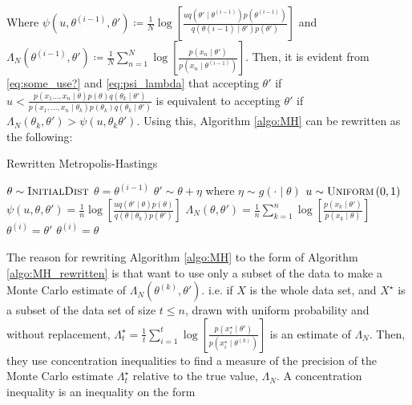 Where $\psi\left(u, \theta^{(i-1)}, \theta'\right)\coloneqq \frac{1}{N}\log\left[\frac{u q\left(\theta'\mid\theta^{(i-1)}\right)p\left(\theta^{(i-1)}\right)}{q\left(\theta{(i-1)}\mid \theta'\right)p\left(\theta'\right)}\right]$ and $\Lambda_N\left(\theta^{(i-1)}, \theta'\right) \coloneqq \frac{1}{N}\sum_{n = 1}^N \log\left[\frac{p\left(x_n\mid \theta'\right)}{p\left(x_n\mid\theta^{(i-1)}\right)}\right]$. Then, it is evident from \eqref{eq:some_use?} and \eqref{eq:psi_lambda} that accepting $\theta'$ if $u < \frac{p\left(x_1\ldots, x_n\mid \theta\right)p\left(\theta\right)q\left(\theta_k\mid \theta'\right)}{p\left(x_1, \ldots, x_n\mid \theta_k\right)p\left(\theta_k\right)q\left(\theta_k\mid\theta'\right)}$ is equivalent to accepting $\theta'$ if $\Lambda_N\left(\theta_k, \theta'\right)>\psi\left(u,\theta_k\theta'\right)$. Using this, Algorithm \ref{algo:MH} can be rewritten as the following:
\begin{algorithm}[H] 
    \caption{Rewritten Metropolis-Hastings}
    \label{algo:MH_rewritten}
    \begin{algorithmic}[1] %
        \State $\theta \sim \textsc{InitialDist}$ 
        \State $\theta = \theta^{\left(i-1\right)}$ 
        \State$\theta' \sim \theta + \eta$ where $\eta\sim g\left(\cdot \mid \theta\right)$
        \State $u\sim \textsc{Uniform}\left(0,1\right)$
        \State $\psi\left(u, \theta, \theta'\right) = \frac{1}{n} \log\left[\frac{u q\left(\theta'\mid \theta \right) p \left(\theta\right)}{q\left(\theta \mid \theta_k \right)p\left(\theta'\right)} \right]$
        \State $\Lambda_N \left(\theta, \theta'\right) = \frac{1}{n} \sum_{k = 1}^n \log \left[\frac{p\left(x_{k}\mid \theta'\right)}{p\left(x_{k}\mid \theta\right)}\right]$
        \State $\theta^{\left(i\right)} = \theta'$
        \Else 
        \State $\theta^{\left(i\right)} = \theta$
         \EndIf
         \EndFor
    \end{algorithmic}
\end{algorithm}
The reason for rewriting Algorithm \ref{algo:MH} to the form of Algorithm \ref{algo:MH_rewritten} is that \cite{Bardenet:2} want to use only a subset of the data to make a Monte Carlo estimate of $\Lambda_N\left(\theta^{\left(k\right)}, \theta'\right)$. 
i.e. if $X$ is the whole data set, and $X^{\star}$ is a subset of the data set of size $t\leq n$, drawn with uniform probability and without replacement, $\Lambda^{\star}_t = \frac{1}{t} \sum_{i = 1}^t \log\left[\frac{p\left(x_i^{\star}\mid \theta'\right)}{p\left(x_i^{\star}\mid \theta^{\left(k\right)}\right)}\right]$ is an estimate of $\Lambda_N$.  Then, they use concentration inequalities to find a measure of the precision of the Monte Carlo estimate $\Lambda_t^{\star}$ relative to the true value,  $\Lambda_N$.
A concentration inequality is an inequality on the form 

